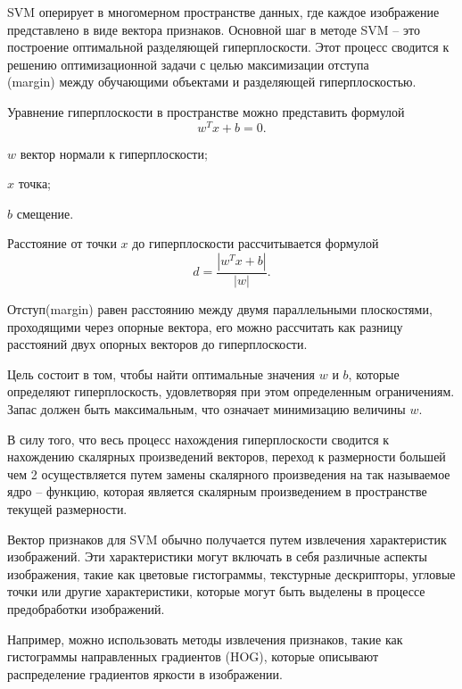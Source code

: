 SVM оперирует в многомерном пространстве данных, где каждое изображение представлено в виде вектора признаков. Основной шаг в методе SVM -- это построение оптимальной разделяющей гиперплоскости. Этот процесс сводится к решению оптимизационной задачи с целью максимизации отступа \\(margin) между обучающими объектами и разделяющей гиперплоскостью.

Уравнение гиперплоскости в пространстве можно представить формулой
\begin{equation}
	\label{eq:svm-line}
	w^{T}x+b=0.
\end{equation}
\begin{eqexpl}[15mm]
	\item{$w$} вектор нормали к гиперплоскости;
	\item{$x$} точка;
	\item{$b$} смещение.
\end{eqexpl}

Расстояние от точки $x$ до гиперплоскости  рассчитывается формулой 
\begin{equation}
	\label{eq:svm-dist}
	d=\frac{|w^Tx+b|}{|w|}.
\end{equation}

Отступ(margin) равен расстоянию между двумя параллельными плоскостями, проходящими через опорные вектора, его можно рассчитать как разницу расстояний двух опорных векторов до гиперплоскости.

Цель состоит в том, чтобы найти оптимальные значения $w$ и $b$, которые определяют гиперплоскость, удовлетворяя при этом определенным ограничениям. Запас должен быть максимальным, что означает минимизацию величины $w$.

В силу того, что весь процесс нахождения гиперплоскости сводится к нахождению скалярных произведений векторов, переход к размерности большей чем 2 осуществляется путем замены скалярного произведения на так называемое ядро -- функцию, которая является скалярным произведением в пространстве текущей размерности.

Вектор признаков для SVM обычно получается путем извлечения характеристик изображений. Эти характеристики могут включать в себя различные аспекты изображения, такие как цветовые гистограммы, текстурные дескрипторы, угловые точки или другие характеристики, которые могут быть выделены в процессе предобработки изображений.

Например, можно использовать методы извлечения признаков, такие как гистограммы направленных градиентов (HOG), которые описывают распределение градиентов яркости в изображении.


